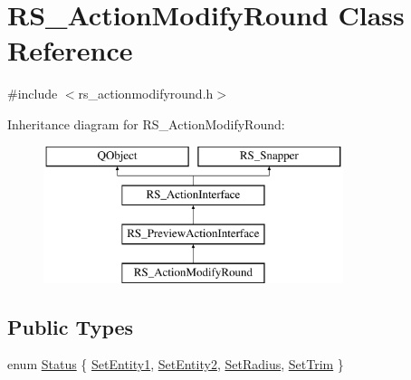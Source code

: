 \hypertarget{classRS__ActionModifyRound}{\section{R\-S\-\_\-\-Action\-Modify\-Round Class Reference}
\label{classRS__ActionModifyRound}
}


{\ttfamily \#include $<$rs\-\_\-actionmodifyround.\-h$>$}

Inheritance diagram for R\-S\-\_\-\-Action\-Modify\-Round\-:\begin{figure}[H]
\begin{center}
\leavevmode
\includegraphics[height=4.000000cm]{classRS__ActionModifyRound}
\end{center}
\end{figure}
\subsection*{Public Types}
\begin{DoxyCompactItemize}
\item 
enum \hyperlink{classRS__ActionModifyRound_a4f4eae11f0a49069a8c0609399b48733}{Status} \{ \hyperlink{classRS__ActionModifyRound_a4f4eae11f0a49069a8c0609399b48733a6f7da8c2518cd30d0773a304933969fc}{Set\-Entity1}, 
\hyperlink{classRS__ActionModifyRound_a4f4eae11f0a49069a8c0609399b48733a8406b726e83695ac109a268ecfa65cef}{Set\-Entity2}, 
\hyperlink{classRS__ActionModifyRound_a4f4eae11f0a49069a8c0609399b48733a53ae775bd4cd517354ebfc0a2302eb4f}{Set\-Radius}, 
\hyperlink{classRS__ActionModifyRound_a4f4eae11f0a49069a8c0609399b48733a102b92e5b1b1860da165bc360a2ee074}{Set\-Trim}
 \}
\end{DoxyCompactItemize}
